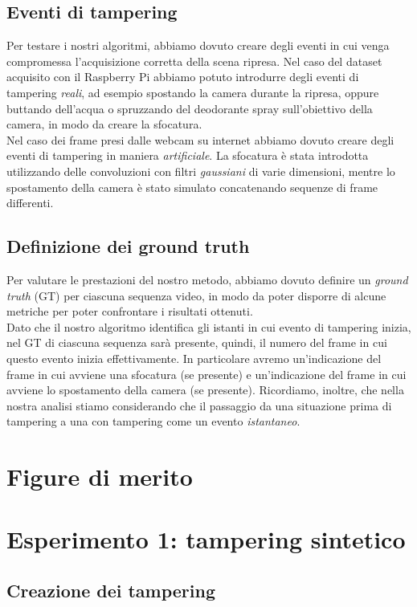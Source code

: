 \subsection{Eventi di tampering}
Per testare i nostri algoritmi, abbiamo dovuto creare degli eventi in cui venga compromessa l'acquisizione corretta della scena ripresa.
Nel caso del dataset acquisito con il Raspberry Pi abbiamo potuto introdurre degli eventi di tampering \textit{reali}, ad esempio spostando la camera durante la ripresa, oppure buttando dell'acqua o spruzzando del deodorante spray sull'obiettivo della camera, in modo da creare la sfocatura.\\
Nel caso dei frame presi dalle webcam su internet abbiamo dovuto creare degli eventi di tampering in maniera \textit{artificiale}.
La sfocatura \`e stata introdotta utilizzando delle convoluzioni con filtri \textit{gaussiani} di varie dimensioni, mentre lo spostamento della camera \`e stato simulato concatenando sequenze di frame differenti.
\subsection{Definizione dei ground truth}
Per valutare le prestazioni del nostro metodo, abbiamo dovuto definire un \textit{ground truth} (GT) per ciascuna sequenza video, in modo da poter disporre di alcune metriche per poter confrontare i risultati ottenuti.\\
Dato che il nostro algoritmo identifica gli istanti in cui evento di tampering inizia, nel GT di ciascuna sequenza sar\`a presente, quindi, il numero del frame in cui questo evento inizia effettivamente. 
In particolare avremo un'indicazione del frame in cui avviene una sfocatura (se presente) e un'indicazione del frame in cui avviene lo spostamento della camera (se presente).
Ricordiamo, inoltre, che nella nostra analisi stiamo considerando che il passaggio da una situazione prima di tampering a una con tampering come un evento \textit{istantaneo}. 
\section{Figure di merito}
\section{Esperimento 1: tampering sintetico}
\subsection{Creazione dei tampering}
